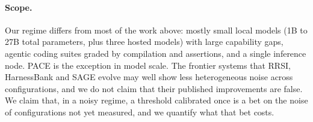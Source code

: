 \paragraph{Scope.}
Our regime differs from most of the work above: mostly small local models (1B to 27B total parameters, plus three hosted models) with large capability gaps, agentic coding suites graded by compilation and assertions, and a single inference node. PACE is the exception in model scale. The
frontier systems that RRSI, HarnessBank and SAGE evolve may well show less
heterogeneous noise across configurations, and we do not claim that their
published improvements are false. We claim that, in a noisy regime, a threshold
calibrated once is a bet on the noise of configurations not yet measured, and
we quantify what that bet costs.
